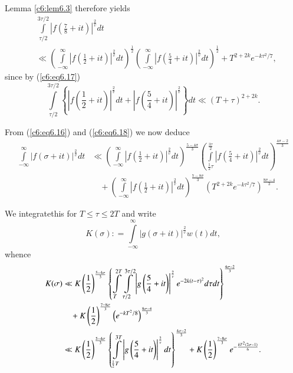 Lemma \ref{c6:lem6.3} therefore yields
\begin{align*}
& \int\limits^{3\tau /2}_{\tau/2} \left|f \left(\frac{7}{8} + it
  \right)\right|^{\frac{2}{v}} dt\\ 
& \ll \left(\int\limits^{\infty}_{-\infty} \left|f \left(\frac{1}{2} +
  it \right)\right|^{\frac{2}{v}} dt \right)^{\frac{1}{2}}
  \left(\int\limits^{\infty}_{-\infty} \left|f \left(\frac{5}{4} + it
  \right)\right|^{\frac{2}{v}} dt \right)^{\frac{1}{2}} + T^{2+2k}
  e^{-k\tau^2/7}, 
\end{align*}
since by (\ref{c6:eq6.17})
$$
\int\limits^{3\tau /2}_{\tau/2} \left\{ \left|f \left(\frac{1}{2} + it 
\right)\right|^{\frac{2}{v}} dt + \left|f \left(\frac{5}{4} + it
\right)\right|^{\frac{2}{v}}  \right\} dt \ll (T + \tau)^{2+2k}. 
$$

From (\ref{c6:eq6.16}) and (\ref{c6:eq6.18}) we now deduce 
\begin{align*}
\int\limits^\infty_{-\infty} |f (\sigma + it)|^{\frac{2}{v}} dt &\ll
\left(\int\limits^\infty_{-\infty} \left|f\left(\frac{1}{2} + it
\right)\right|^{\frac{2}{v}} dt \right)^{\frac{5-4\sigma}{3}} \left(
\int\limits^{\frac{3\tau}{2}}_{\frac{1}{2} \tau} \left|f \left(\frac{5}{4}
+ it \right)\right|^{\frac{2}{v}} dt \right)^{\frac{4\sigma -2}{3}}\\ 
&\quad + \left(\int\limits^\infty_{-\infty} \left|f \left(\frac{1}{2}
+ it \right)\right|^{\frac{2}{v}} dt \right)^{\frac{7-8\sigma}{3}}
\left(T^{2+2k} e^{-k\tau^2/7} \right)^{\frac{8\sigma -4}{3}}. 
\end{align*}

We integrate\pageoriginale this for $T \leq \tau \leq 2T$ and write
$$
K(\sigma) : = \int\limits^\infty_{-\infty} |g(\sigma +
it)|^{\frac{2}{v}} w (t) dt, 
$$
whence
\begin{align}
K(\sigma) & \ll K \left(\frac{1}{2} \right)^{\frac{5-4\sigma}{3}}
\left\{ \int\limits^{2T}_T \int\limits^{3 \tau/2}_{\tau/2}\left|g
\left(\frac{5}{4} + it \right)\right|^{\frac{2}{v}}  e^{-2k
  (t-\tau)^2}d 
\tau dt\right\}^{\frac{4\sigma -2}{3}}\label{c6:eq6.20}\\ 
&\quad + K \left(\frac{1}{2} \right)^{\frac{7-8\sigma}{3}}
\left(e^{-kT^2/8}\right)^{\frac{8 \sigma - 4}{3}}\notag \\ 
&\ll K \left(\frac{1}{2} \right)^{\frac{5-4\sigma}{3}}
\left\{\int\limits^{3T}_{\frac{1}{2} T} \left|g \left(\frac{5}{4} + it
\right)\right|^{\frac{2}{v}} dt\right\}^{\frac{4\sigma-2}{3}} + K
\left(\frac{1}{2} \right)^{\frac{7-8\sigma}{3}} e^{-\frac{kT^2(2\sigma 
    -1)}{6}}.\notag 
\end{align}

